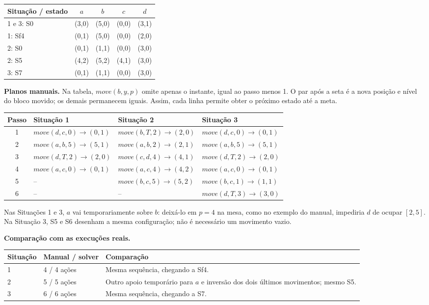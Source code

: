 \documentclass[11pt,a4paper]{article}
\begin{document}
\begin{center}
\begin{tabular}{lcccc}
\toprule Situação / estado & $a$ & $b$ & $c$ & $d$ \\ \midrule
1 e 3: S0 & (3,0)&(5,0)&(0,0)&(3,1)\\
1: Sf4 & (0,1)&(5,0)&(0,0)&(2,0)\\
2: S0 & (0,1)&(1,1)&(0,0)&(3,0)\\
2: S5 & (4,2)&(5,2)&(4,1)&(3,0)\\
3: S7 & (0,1)&(1,1)&(0,0)&(3,0)\\ \bottomrule
\end{tabular}
\end{center}

\textbf{Planos manuais.} Na tabela, $move(b,y,p)$ omite apenas o instante, igual ao passo menos 1. O par após a seta é a nova posição e nível do bloco movido; os demais permanecem iguais. Assim, cada linha permite obter o próximo estado até a meta.

\begin{center}\small
\begin{tabular}{clll}
\toprule Passo & Situação 1 & Situação 2 & Situação 3\\ \midrule
1 & $move(d,c,0)\to(0,1)$ & $move(b,T,2)\to(2,0)$ & $move(d,c,0)\to(0,1)$\\
2 & $move(a,b,5)\to(5,1)$ & $move(a,b,2)\to(2,1)$ & $move(a,b,5)\to(5,1)$\\
3 & $move(d,T,2)\to(2,0)$ & $move(c,d,4)\to(4,1)$ & $move(d,T,2)\to(2,0)$\\
4 & $move(a,c,0)\to(0,1)$ & $move(a,c,4)\to(4,2)$ & $move(a,c,0)\to(0,1)$\\
5 & -- & $move(b,c,5)\to(5,2)$ & $move(b,c,1)\to(1,1)$\\
6 & -- & -- & $move(d,T,3)\to(3,0)$\\ \bottomrule
\end{tabular}
\end{center}

Nas Situações 1 e 3, $a$ vai temporariamente sobre $b$: deixá-lo em $p=4$ na mesa, como no exemplo do manual, impediria $d$ de ocupar $[2,5]$. Na Situação 3, S5 e S6 desenham a mesma configuração; não é necessário um movimento vazio.

\textbf{Comparação com as execuções reais.}

\begin{tabularx}{\linewidth}{lL{2.2cm}Y}
\toprule Situação & Manual / solver & Comparação \\  & 4 / 4 ações & Mesma sequência, chegando a Sf4.\\
2 & 5 / 5 ações & Outro apoio temporário para $a$ e inversão dos dois últimos movimentos; mesmo S5.\\
3 & 6 / 6 ações & Mesma sequência, chegando a S7.\\ \bottomrule
\end{tabularx}
\end{document}
